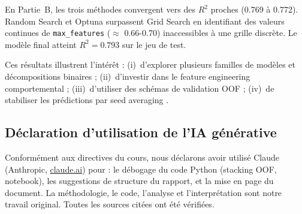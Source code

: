 \documentclass[11pt,a4paper]{article}
\newcommand{\code}[1]{\texttt{\small #1}}
\begin{document}
En Partie~B, les trois méthodes convergent vers des $R^2$ proches (0.769
à 0.772). Random Search \parencite{bergstra2012} et Optuna
\parencite{akiba2019} surpassent Grid Search \parencite{geron2019} en
identifiant des valeurs continues de \code{max\_features} ($\approx$
0.66-0.70) inaccessibles à une grille discrète. Le modèle final atteint
$R^2 = 0.793$ sur le jeu de test.

Ces résultats illustrent l'intérêt : (i)~d'explorer plusieurs familles de
modèles et décompositions binaires \parencite{galar2011} ; (ii)~d'investir
dans le feature engineering comportemental ; (iii)~d'utiliser des schémas
de validation OOF \parencite{wolpert1992} ; (iv)~de stabiliser les
prédictions par seed averaging \parencite{izmailov2018}.

\subsection*{Déclaration d'utilisation de l'IA générative}

Conformément aux directives du cours, nous déclarons avoir utilisé Claude
(Anthropic, \url{claude.ai}) pour : le débogage du code Python (stacking
OOF, notebook), les suggestions de structure du rapport, et la mise en
page du document. La méthodologie, le code, l'analyse et l'interprétation
sont notre travail original. Toutes les sources citées ont été vérifiées.

\printbibliography[title={Références}]
\end{document}
